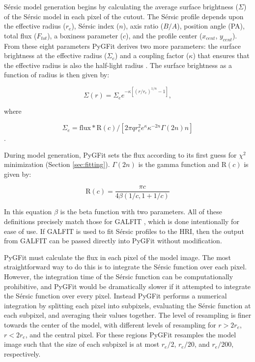 \documentclass[apj]{emulateapj}
\newcommand{\sersic}{S\'{e}rsic}
\newcommand{\galfit}{GALFIT}
\newcommand{\pygfit}{PyGFit}
\begin{document}
\sersic{} model generation begins by calculating the average surface brightness ($\Sigma$) of the \sersic{} model in each pixel of the cutout.  The \sersic{} profile depends upon the effective radius ($r_e$), \sersic{} index ($n$), axis ratio ($B/A$), position angle (PA), total flux ($F_{tot}$), a boxiness parameter ($c$), and the profile center ($x_{cent}$, $y_{cent}$).  From these eight parameters \pygfit{} derives two more parameters: the surface brightness at the effective radius ($\Sigma_e$) and a coupling factor ($\kappa$) that ensures that the effective radius is also the half-light radius \citep[see for example][]{peng02}.  The surface brightness as a function of radius is then given by:

\begin{equation}\Sigma(r) = \Sigma_{e}e^{-\kappa[(r/r_e)^{1/n}-1]},\end{equation}

where

\begin{equation}\Sigma_e = \textrm{flux}*\textrm{R}(c) / [ 2{\pi}qr_e^2e^{\kappa}\kappa^{-2n}\Gamma(2n)n ]\end{equation}.

During model generation, \pygfit{} sets the flux according to its first guess for $\chi^2$ minimization (Section \ref{sec:fitting}).  $\Gamma(2n)$ is the gamma function and $\textrm{R}(c)$ is given by:

\begin{equation}\textrm{R}(c) = \frac{{\pi}c}{4\beta(1/c, 1+1/c)}\end{equation}

{\noindent}In this equation $\beta$ is the beta function with two parameters.  All of these definitions precisely match those for \galfit{} \citep{peng02,peng10}, which is done intentionally for ease of use.  If \galfit{} is used to fit \sersic{} profiles to the HRI, then the output from \galfit{} can be passed directly into \pygfit{} without modification.

\pygfit{} must calculate the flux in each pixel of the model image.  The most straightforward way to do this is to integrate the \sersic{} function over each pixel.  However, the integration time of the \sersic{} function can be computationally prohibitive, and \pygfit{} would be dramatically slower if it attempted to integrate the \sersic{} function over every pixel.  Instead \pygfit{} performs a numerical integration by splitting each pixel into subpixels, evaluating the \sersic{} function at each subpixel, and averaging their values together.  The level of resampling is finer towards the center of the model, with different levels of resampling for $r>2r_e$, $r<2r_e$, and the central pixel.  For these regions \pygfit{} resamples the model image such that the size of each subpixel is at most $r_e/2$, $r_e/20$, and $r_e/200$, respectively.
\end{document}
